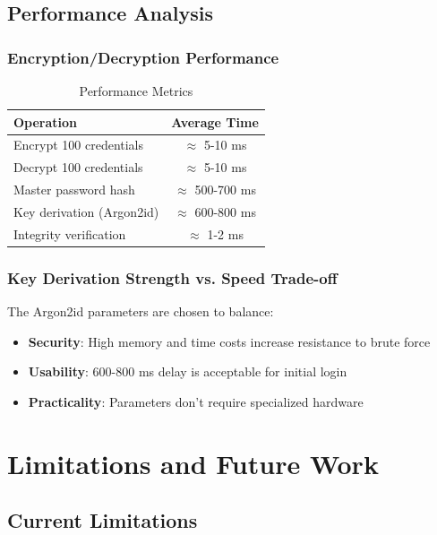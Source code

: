\documentclass[12pt,a4paper]{report}
\begin{document}
\section{Performance Analysis}

\subsection{Encryption/Decryption Performance}

\begin{table}[H]
\centering
\begin{tabular}{|l|c|}
\hline
\textbf{Operation} & \textbf{Average Time} \\
\hline
Encrypt 100 credentials & $\approx$ 5-10 ms \\
Decrypt 100 credentials & $\approx$ 5-10 ms \\
Master password hash & $\approx$ 500-700 ms \\
Key derivation (Argon2id) & $\approx$ 600-800 ms \\
Integrity verification & $\approx$ 1-2 ms \\
\hline
\end{tabular}
\caption{Performance Metrics}
\end{table}

\subsection{Key Derivation Strength vs. Speed Trade-off}

The Argon2id parameters are chosen to balance:
\begin{itemize}
    \item \textbf{Security}: High memory and time costs increase resistance to brute force
    \item \textbf{Usability}: 600-800 ms delay is acceptable for initial login
    \item \textbf{Practicality}: Parameters don't require specialized hardware
\end{itemize}

\chapter{Limitations and Future Work}

\section{Current Limitations}
\end{document}
